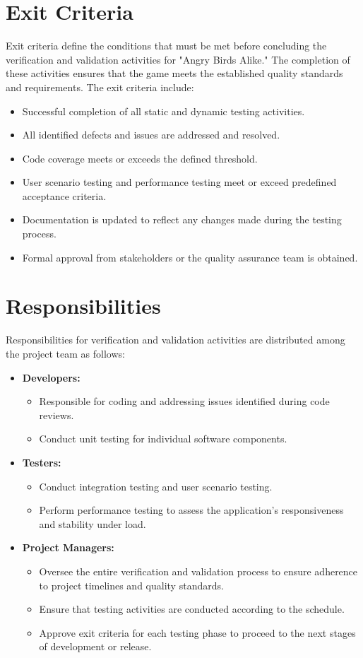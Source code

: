 \documentclass[12pt]{article}
\begin{document}
\section{Exit Criteria}
Exit criteria define the conditions that must be met before concluding the verification and validation activities for "Angry Birds Alike." The completion of these activities ensures that the game meets the established quality standards and requirements. The exit criteria include:
\begin{itemize}
    \item Successful completion of all static and dynamic testing activities.
    \item All identified defects and issues are addressed and resolved.
    \item Code coverage meets or exceeds the defined threshold.
    \item User scenario testing and performance testing meet or exceed predefined acceptance criteria.
    \item Documentation is updated to reflect any changes made during the testing process.
    \item Formal approval from stakeholders or the quality assurance team is obtained.
\end{itemize}

\section{Responsibilities}
Responsibilities for verification and validation activities are distributed among the project team as follows:
\begin{itemize}
    \item \textbf{Developers:}
    \begin{itemize}
        \item Responsible for coding and addressing issues identified during code reviews.
        \item Conduct unit testing for individual software components.
    \end{itemize}
    \item \textbf{Testers:}
    \begin{itemize}
        \item Conduct integration testing and user scenario testing.
        \item Perform performance testing to assess the application's responsiveness and stability under load.
    \end{itemize}
    \item \textbf{Project Managers:}
    \begin{itemize}
        \item Oversee the entire verification and validation process to ensure adherence to project timelines and quality standards.
        \item Ensure that testing activities are conducted according to the schedule.
        \item Approve exit criteria for each testing phase to proceed to the next stages of development or release.
    \end{itemize}
\end{itemize}
\end{document}

